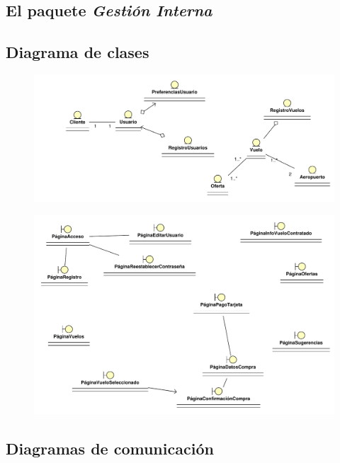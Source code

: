 \documentclass[11pt, a4paper, twoside, titlepage]{article}
\begin{document}
\begin{landscape}
	\section{El paquete {\itshape Gestión Interna}}
		\subsection{Diagrama de clases}

			\begin{figure}[H]\centering
				\vspace{2cm}
				\hspace{-2cm}
				\includegraphics[scale=1]{diagramas/diagramaclases.pdf}
			\end{figure}		
\end{landscape}
\begin{landscape}
			\begin{figure}[H]\centering
				\includegraphics[scale=1]{diagramas/sitioweb.pdf}
			\end{figure}
\end{landscape}

		\subsection{Diagramas de comunicación}
\end{document}
